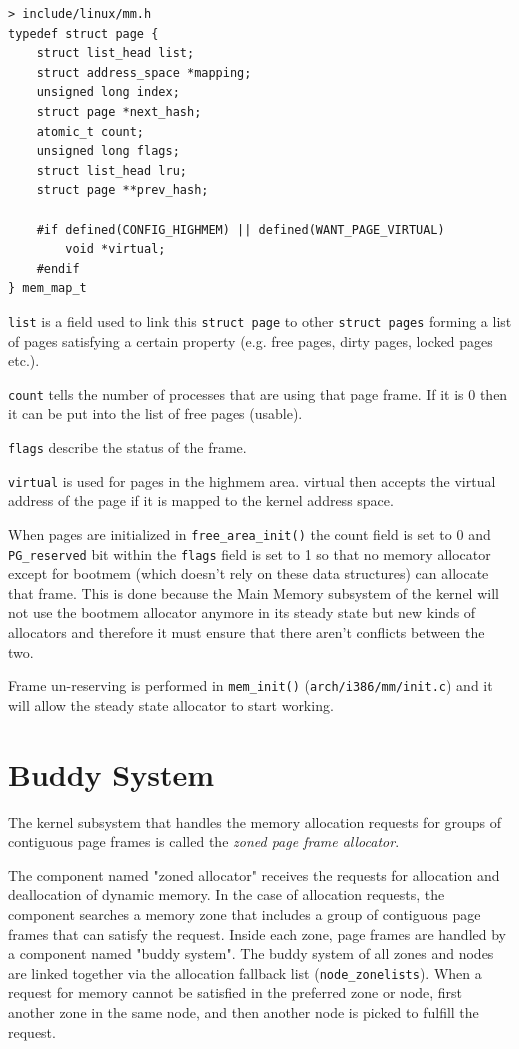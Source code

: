 \documentclass[twoside]{article}
\renewcommand{\cite}[1]{[#1]}
\begin{document}
\begin{verbatim}
> include/linux/mm.h
typedef struct page {
    struct list_head list;
    struct address_space *mapping;
    unsigned long index;
    struct page *next_hash;
    atomic_t count;
    unsigned long flags;
    struct list_head lru;
    struct page **prev_hash;

    #if defined(CONFIG_HIGHMEM) || defined(WANT_PAGE_VIRTUAL)
        void *virtual;
    #endif
} mem_map_t
\end{verbatim}

\texttt{list} is a field used to link this \texttt{struct page} to other
\texttt{struct pages} forming a list of pages satisfying a certain property
(e.g. free pages, dirty pages, locked pages etc.).

\texttt{count} tells the number of processes that are using that page frame. If
it is 0 then it can be put into the list of free pages (usable).

\texttt{flags} describe the status of the frame. 

\texttt{virtual} is used for pages in the highmem area.
virtual then accepts the virtual address of the page if it is mapped to the
kernel address space.

When pages are initialized in \texttt{free_area_init()} the count field is set
to 0 and \texttt{PG_reserved} bit within the \texttt{flags} field is set to 1
so that no memory allocator except for bootmem (which doesn't rely on these data
structures) can allocate that frame. This is done because the Main Memory
subsystem of the kernel will not use the bootmem allocator anymore in its steady
state but new kinds of allocators and therefore it must ensure that there aren't
conflicts between the two.

Frame un-reserving is performed in \texttt{mem_init()}
(\texttt{arch/i386/mm/init.c}) and it will allow the steady state allocator to
start working.

\section{Buddy System}
The kernel subsystem that handles the memory allocation requests for groups of
contiguous page frames is called the \textit{zoned page frame allocator}. \marginnote{(\cite{bovet_cesati_2006} pp. 302),
(\cite{mauerer_2010} pp. 14, Sec. 3.5.1) (\cite{gorman_2004} Chap. 6)  }

The component named "zoned allocator" receives the requests for allocation and
deallocation of dynamic memory. In the case of allocation requests, the
component searches a memory zone that includes a group of contiguous page frames
that can satisfy the request. Inside each zone, page frames are handled by a
component named "buddy system". The buddy system of all zones and nodes are
linked together via the allocation fallback list (\texttt{node_zonelists}).
When a request for memory
cannot be satisfied in the preferred zone or node, first another zone in the
same node, and then another node is picked to fulfill the request.
\end{document}

